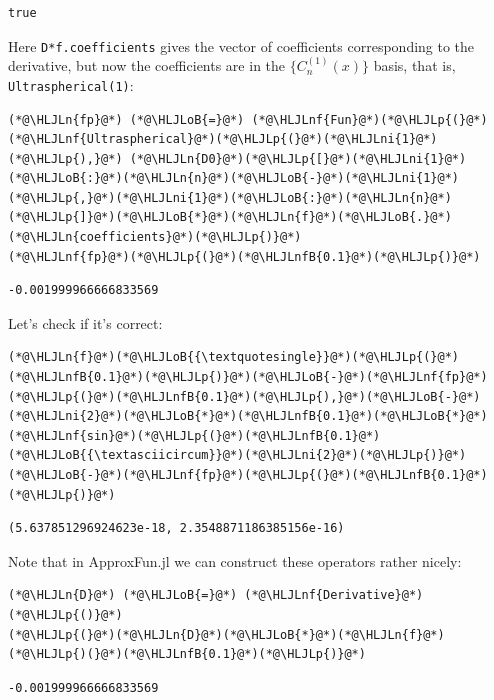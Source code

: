 \documentclass[12pt,a4paper]{article}
\newcommand{\HLJLn}[1]{#1}
\newcommand{\HLJLnf}[1]{\textcolor[RGB]{66,102,213}{#1}}
\newcommand{\HLJLnfB}[1]{\textcolor[RGB]{59,151,46}{#1}}
\newcommand{\HLJLni}[1]{\textcolor[RGB]{59,151,46}{#1}}
\newcommand{\HLJLoB}[1]{\textcolor[RGB]{102,102,102}{\textbf{#1}}}
\newcommand{\HLJLp}[1]{#1}
\begin{document}
\begin{lstlisting}
true
\end{lstlisting}


Here \texttt{D*f.coefficients} gives the vector of coefficients corresponding to the derivative, but now the coefficients are in the $\lbrace C_n^{(1)}(x)\rbrace$ basis, that is, \texttt{Ultraspherical(1)}:


\begin{lstlisting}
(*@\HLJLn{fp}@*) (*@\HLJLoB{=}@*) (*@\HLJLnf{Fun}@*)(*@\HLJLp{(}@*)(*@\HLJLnf{Ultraspherical}@*)(*@\HLJLp{(}@*)(*@\HLJLni{1}@*)(*@\HLJLp{),}@*) (*@\HLJLn{D0}@*)(*@\HLJLp{[}@*)(*@\HLJLni{1}@*)(*@\HLJLoB{:}@*)(*@\HLJLn{n}@*)(*@\HLJLoB{-}@*)(*@\HLJLni{1}@*)(*@\HLJLp{,}@*)(*@\HLJLni{1}@*)(*@\HLJLoB{:}@*)(*@\HLJLn{n}@*)(*@\HLJLp{]}@*)(*@\HLJLoB{*}@*)(*@\HLJLn{f}@*)(*@\HLJLoB{.}@*)(*@\HLJLn{coefficients}@*)(*@\HLJLp{)}@*)
(*@\HLJLnf{fp}@*)(*@\HLJLp{(}@*)(*@\HLJLnfB{0.1}@*)(*@\HLJLp{)}@*)
\end{lstlisting}

\begin{lstlisting}
-0.001999966666833569
\end{lstlisting}


Let's check if it's correct:


\begin{lstlisting}
(*@\HLJLn{f}@*)(*@\HLJLoB{{\textquotesingle}}@*)(*@\HLJLp{(}@*)(*@\HLJLnfB{0.1}@*)(*@\HLJLp{)}@*)(*@\HLJLoB{-}@*)(*@\HLJLnf{fp}@*)(*@\HLJLp{(}@*)(*@\HLJLnfB{0.1}@*)(*@\HLJLp{),}@*)(*@\HLJLoB{-}@*)(*@\HLJLni{2}@*)(*@\HLJLoB{*}@*)(*@\HLJLnfB{0.1}@*)(*@\HLJLoB{*}@*)(*@\HLJLnf{sin}@*)(*@\HLJLp{(}@*)(*@\HLJLnfB{0.1}@*)(*@\HLJLoB{{\textasciicircum}}@*)(*@\HLJLni{2}@*)(*@\HLJLp{)}@*)(*@\HLJLoB{-}@*)(*@\HLJLnf{fp}@*)(*@\HLJLp{(}@*)(*@\HLJLnfB{0.1}@*)(*@\HLJLp{)}@*)
\end{lstlisting}

\begin{lstlisting}
(5.637851296924623e-18, 2.3548871186385156e-16)
\end{lstlisting}


Note that in ApproxFun.jl we can construct these operators rather nicely:


\begin{lstlisting}
(*@\HLJLn{D}@*) (*@\HLJLoB{=}@*) (*@\HLJLnf{Derivative}@*)(*@\HLJLp{()}@*)
(*@\HLJLp{(}@*)(*@\HLJLn{D}@*)(*@\HLJLoB{*}@*)(*@\HLJLn{f}@*)(*@\HLJLp{)(}@*)(*@\HLJLnfB{0.1}@*)(*@\HLJLp{)}@*)
\end{lstlisting}

\begin{lstlisting}
-0.001999966666833569
\end{lstlisting}
\end{document}

